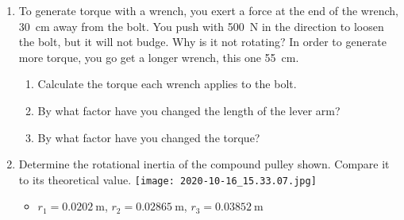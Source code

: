 \begin{enumerate}
    \item To generate torque with a wrench, you exert a force at the end of the wrench, \SI{30}{\centi\meter} away from the bolt. You push with \SI{500}{\newton} in the direction to loosen the bolt, but it will not budge. Why is it not rotating? In order to generate more torque, you go get a longer wrench, this one \SI{55}{\centi\meter}.

		\begin{enumerate}
			
			\item Calculate the torque each wrench applies to the bolt.
			
			\item By what factor have you changed the length of the lever arm?
			
			\item By what factor have you changed the torque?
		\end{enumerate}\bigskip
	
%	
%	
%		
%		
%		


%	
%	
	\item Determine the rotational inertia of the compound pulley shown. Compare it to its theoretical value.
	\texttt{[image: 2020-10-16\_15.33.07.jpg]}
	\begin{itemize}
		\item $r_1 = \SI{0.0202}{\meter}$, $r_2 = \SI{0.02865}{\meter}$, $r_3 = \SI{0.03852}{\meter}$
		

\end{itemize}
\end{enumerate}
